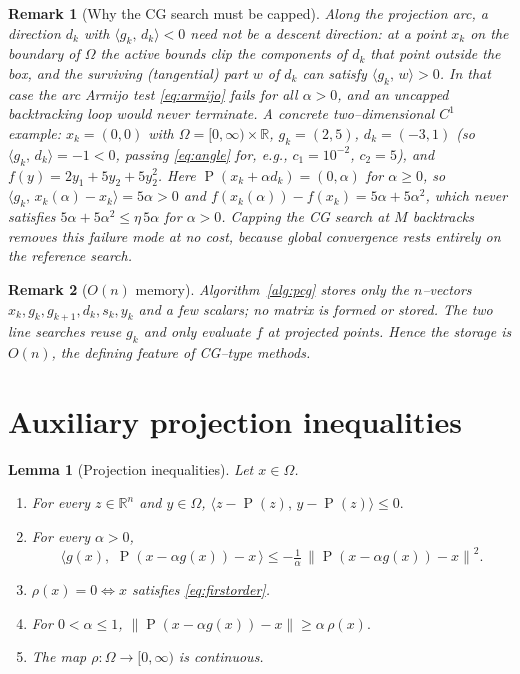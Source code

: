 \documentclass[12pt]{article}
\newtheorem{lemma}{Lemma}
\newtheorem{remark}{Remark}
\DeclareMathOperator{\proj}{P}
\newcommand{\R}{\mathbb{R}}
\newcommand{\norm}[1]{\left\lVert #1 \right\rVert}
\newcommand{\inner}[2]{\langle #1,\, #2\rangle}
\begin{document}
\begin{remark}[Why the CG search must be capped]\label{rem:cgterm}
Along the \emph{projection arc}, a direction $d_k$ with $\inner{g_k}{d_k}<0$
need \emph{not} be a descent direction: at a point $x_k$ on the boundary of
$\Omega$ the active bounds clip the components of $d_k$ that point outside the
box, and the surviving (tangential) part $w$ of $d_k$ can satisfy
$\inner{g_k}{w}>0$. In that case the arc Armijo test \eqref{eq:armijo} fails for
\emph{all} $\alpha>0$, and an uncapped backtracking loop would never terminate.
A concrete two--dimensional $C^1$ example: $x_k=(0,0)$ with
$\Omega=[0,\infty)\times\R$, $g_k=(2,5)$, $d_k=(-3,1)$ (so
$\inner{g_k}{d_k}=-1<0$, passing \eqref{eq:angle} for, e.g., $c_1=10^{-2}$,
$c_2=5$), and $f(y)=2y_1+5y_2+5y_2^2$. Here
$\proj(x_k+\alpha d_k)=(0,\alpha)$ for $\alpha\ge0$, so
$\inner{g_k}{x_k(\alpha)-x_k}=5\alpha>0$ and
$f(x_k(\alpha))-f(x_k)=5\alpha+5\alpha^2$, which never satisfies
$5\alpha+5\alpha^2\le\eta\,5\alpha$ for $\alpha>0$. Capping the CG search at $M$
backtracks removes this failure mode at no cost, because global convergence
rests entirely on the reference search.
\end{remark}

\begin{remark}[$O(n)$ memory]\label{rem:mem}
Algorithm~\ref{alg:pcg} stores only the $n$--vectors
$x_k,g_k,g_{k+1},d_k,s_k,y_k$ and a few scalars; no matrix is formed or stored.
The two line searches reuse $g_k$ and only evaluate $f$ at projected points.
Hence the storage is $O(n)$, the defining feature of CG--type methods.
\end{remark}

\section{Auxiliary projection inequalities}

\begin{lemma}[Projection inequalities]\label{lem:proj}
Let $x\in\Omega$.
\begin{enumerate}
\item[(i)] For every $z\in\R^n$ and $y\in\Omega$,
$\inner{z-\proj(z)}{y-\proj(z)}\le0.$
\item[(ii)] For every $\alpha>0$,
\begin{equation}\label{eq:keydescent}
\inner{g(x)}{\,\proj(x-\alpha g(x))-x\,}\le
-\tfrac{1}{\alpha}\,\norm{\proj(x-\alpha g(x))-x}^2 .
\end{equation}
\item[(iii)] $\rho(x)=0\iff x$ satisfies \eqref{eq:firstorder}.
\item[(iv)] For $0<\alpha\le1$,
$\norm{\proj(x-\alpha g(x))-x}\ge\alpha\,\rho(x).$
\item[(v)] The map $\rho:\Omega\to[0,\infty)$ is continuous.
\end{enumerate}
\end{lemma}
\end{document}
